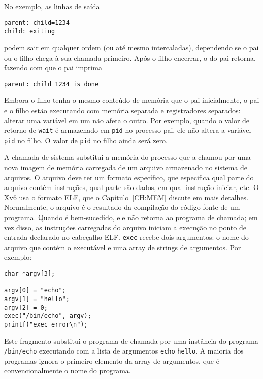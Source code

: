 No exemplo, as linhas de saída
\begin{lstlisting}[]
parent: child=1234
child: exiting
\end{lstlisting}
podem sair em qualquer ordem (ou até mesmo intercaladas), dependendo se o
pai ou o filho chega à sua
chamada 
primeiro.
Após o filho encerrar, o  do pai
retorna, fazendo com que o pai imprima
\begin{lstlisting}[]
parent: child 1234 is done
\end{lstlisting}
Embora o filho tenha o mesmo conteúdo de memória que o pai inicialmente, o
pai e o filho estão executando com memória separada e registradores separados:
alterar uma variável em um não afeta o outro. Por exemplo, quando o
valor de retorno de
\lstinline{wait}
é armazenado em
\lstinline{pid}
no processo pai,
ele não altera a variável
\lstinline{pid}
no filho.  O valor de
\lstinline{pid}
no filho ainda será zero.

A
chamada de sistema 
substitui a memória do processo que a chamou por uma nova imagem de memória
carregada de um arquivo armazenado no sistema de arquivos.
O arquivo deve ter um formato específico, que especifica qual parte do
arquivo contém instruções, qual parte são dados, em qual instrução
iniciar, etc. O Xv6
usa o formato ELF, que o Capítulo~\ref{CH:MEM} discute em
mais detalhes.
Normalmente, o arquivo é o resultado da compilação do código-fonte de um programa.
Quando
é bem-sucedido, ele não retorna ao programa de chamada;
em vez disso, as instruções carregadas do arquivo iniciam
a execução no ponto de entrada declarado no cabeçalho ELF.
\lstinline{exec}
recebe dois argumentos: o nome do arquivo que contém o
executável e uma array de strings de argumentos.
Por exemplo:
\begin{lstlisting}[]
char *argv[3];

argv[0] = "echo";
argv[1] = "hello";
argv[2] = 0;
exec("/bin/echo", argv);
printf("exec error\n");
\end{lstlisting}
Este fragmento substitui o programa de chamada por uma instância
do programa
\lstinline{/bin/echo}
executando com a lista de argumentos
\lstinline{echo}
\lstinline{hello}.
A maioria dos programas ignora o primeiro elemento da array de argumentos, que é
convencionalmente o nome do programa.

